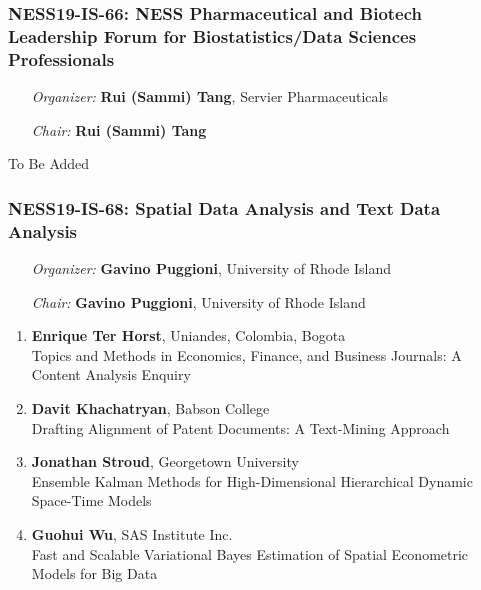 \subsubsection*{NESS19-IS-66: NESS Pharmaceutical and Biotech Leadership Forum for Biostatistics/Data Sciences Professionals}

\begin{enumerate}[align=left]
\item [\emph{Organizer:}] \textbf{Rui (Sammi) Tang}, Servier Pharmaceuticals \\
\item [\emph{Chair:}] \textbf{Rui (Sammi) Tang}
\end{enumerate}

To Be Added

\subsubsection*{NESS19-IS-68: Spatial Data Analysis and Text Data Analysis}

\begin{enumerate}[align=left]
\item [\emph{Organizer:}] \textbf{Gavino Puggioni}, University of Rhode Island \\
\item [\emph{Chair:}] \textbf{Gavino Puggioni}, University of Rhode Island
\end{enumerate}

\begin{enumerate}
\item \textbf{Enrique Ter Horst}, Uniandes, Colombia, Bogota \\
Topics and Methods in Economics, Finance, and Business Journals: A Content Analysis Enquiry
\item \textbf{Davit Khachatryan}, Babson College \\
Drafting Alignment of Patent Documents: A Text-Mining Approach
\item \textbf{Jonathan Stroud}, Georgetown University \\
Ensemble Kalman Methods for High-Dimensional Hierarchical Dynamic Space-Time Models
\item \textbf{Guohui Wu}, SAS Institute Inc. \\
Fast and Scalable Variational Bayes Estimation of Spatial Econometric Models for Big Data
\end{enumerate}

